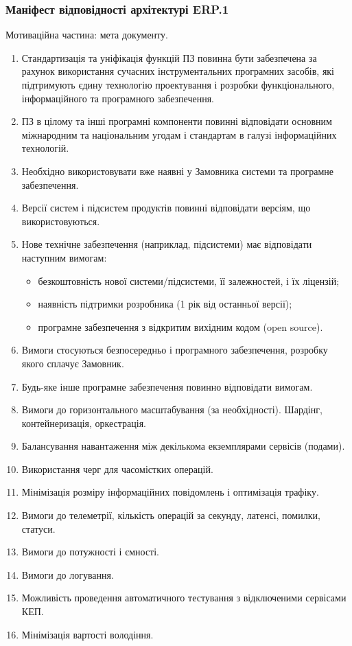 \documentclass{article}
\begin{document}
\newpage
\subsubsection{Маніфест відповідності архітектурі ERP.1}

Мотиваційна частина: мета документу.

\begin{enumerate}
  \item Стандартизація та уніфікація функцій ПЗ повинна бути забезпечена за рахунок використання сучасних інструментальних програмних засобів, які підтримують єдину технологію проектування і розробки функціонального, інформаційного та програмного забезпечення.
  \item ПЗ в цілому та інші програмні компоненти повинні відповідати основним міжнародним та національним угодам і стандартам в галузі інформаційних технологій.
  \item Необхідно використовувати вже наявні у Замовника системи та програмне забезпечення.
  \item Версії систем і підсистем продуктів повинні відповідати версіям, що використовуються.
  \item Нове технічне забезпечення (наприклад, підсистеми) має відповідати наступним вимогам:
    \begin{itemize}
      \item безкоштовність нової системи/підсистеми, її залежностей, і їх ліцензій;
      \item наявність підтримки розробника (1 рік від останньої версії);
      \item програмне забезпечення з відкритим вихідним кодом (open source).
    \end{itemize}
  \item Вимоги стосуються безпосередньо і програмного забезпечення, розробку якого сплачує Замовник.
  \item Будь-яке інше програмне забезпечення повинно відповідати вимогам.
  \item Вимоги до горизонтального масштабування (за необхідності). Шардінг, контейнеризація, оркестрація.
  \item Балансування навантаження між декількома екземплярами сервісів (подами).
  \item Використання черг для часомістких операцій.
  \item Мінімізація розміру інформаційних повідомлень і оптимізація трафіку.
  \item Вимоги до телеметрії, кількість операцій за секунду, латенсі, помилки, статуси.
  \item Вимоги до потужності і ємності.
  \item Вимоги до логування.
  \item Можливість проведення автоматичного тестування з відключеними сервісами КЕП.
  \item Мінімізація вартості володіння.
\end{enumerate}
\end{document}
